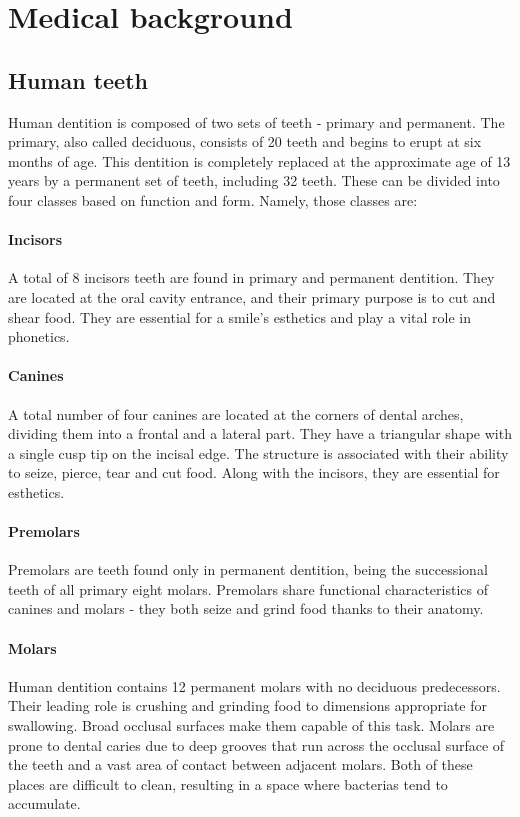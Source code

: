 \chapter{Medical background}
\label{chapter:medical_background}

\section{Human teeth}
Human dentition is composed of two sets of teeth - primary and permanent. The primary, also called deciduous, consists of 20 teeth and begins to erupt at six months of age. This dentition is completely replaced at the approximate age of 13 years by a permanent set of teeth, including 32 teeth. These can be divided into four classes based on function and form. Namely, those classes are:

\subsubsection*{Incisors}
A total of 8 incisors teeth are found in primary and permanent dentition. They are located at the oral cavity entrance, and their primary purpose is to cut and shear food. They are essential for a smile's esthetics and play a vital role in phonetics.

\subsubsection*{Canines}
A total number of four canines are located at the corners of dental arches, dividing them into a frontal and a lateral part. They have a triangular shape with a single cusp tip on the incisal edge. The structure is associated with their ability to seize, pierce, tear and cut food. Along with the incisors, they are essential for esthetics.

\subsubsection*{Premolars}
Premolars are teeth found only in permanent dentition, being the successional teeth of all primary eight molars. Premolars share functional characteristics of canines and molars - they both seize and grind food thanks to their anatomy.

\subsubsection*{Molars}
Human dentition contains 12 permanent molars with no deciduous predecessors. Their leading role is crushing and grinding food to dimensions appropriate for swallowing. Broad occlusal surfaces make them capable of this task. Molars are prone to dental caries due to deep grooves that run across the occlusal surface of the teeth and a vast area of contact between adjacent molars. Both of these places are difficult to clean, resulting in a space where bacterias tend to accumulate.


